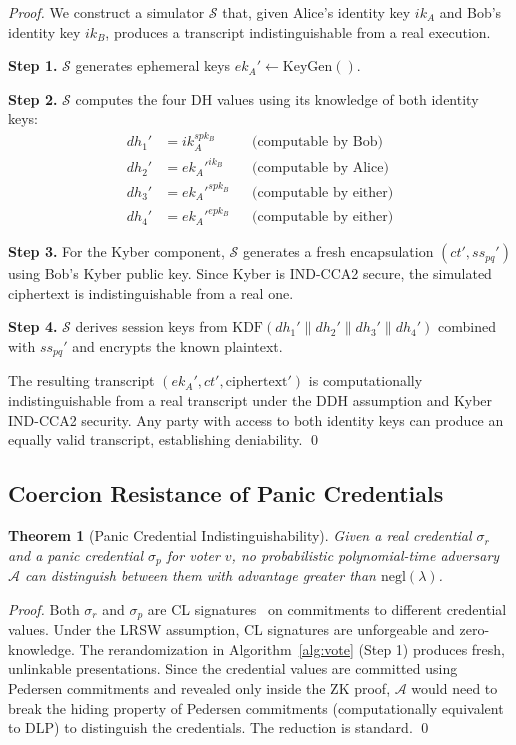 \documentclass[11pt,a4paper]{article}
\newtheorem{theorem}{Theorem}
\begin{document}
\begin{proof}
We construct a simulator $\mathcal{S}$ that, given Alice's identity key $ik_A$ and Bob's identity key $ik_B$, produces a transcript indistinguishable from a real execution.

\textbf{Step 1.} $\mathcal{S}$ generates ephemeral keys $ek_A' \leftarrow \text{KeyGen}()$.

\textbf{Step 2.} $\mathcal{S}$ computes the four DH values using its knowledge of both identity keys:
\begin{align}
dh_1' &= ik_A^{spk_B} && \text{(computable by Bob)} \\
dh_2' &= ek_A'^{ik_B} && \text{(computable by Alice)} \\
dh_3' &= ek_A'^{spk_B} && \text{(computable by either)} \\
dh_4' &= ek_A'^{epk_B} && \text{(computable by either)}
\end{align}

\textbf{Step 3.} For the Kyber component, $\mathcal{S}$ generates a fresh encapsulation $(ct', ss_{pq}')$ using Bob's Kyber public key. Since Kyber is IND-CCA2 secure, the simulated ciphertext is indistinguishable from a real one.

\textbf{Step 4.} $\mathcal{S}$ derives session keys from $\text{KDF}(dh_1' \| dh_2' \| dh_3' \| dh_4')$ combined with $ss_{pq}'$ and encrypts the known plaintext.

The resulting transcript $(ek_A', ct', \text{ciphertext}')$ is computationally indistinguishable from a real transcript under the DDH assumption and Kyber IND-CCA2 security. Any party with access to both identity keys can produce an equally valid transcript, establishing deniability. \qed
\end{proof}

\subsection{Coercion Resistance of Panic Credentials}

\begin{theorem}[Panic Credential Indistinguishability]
Given a real credential $\sigma_r$ and a panic credential $\sigma_p$ for voter $v$, no probabilistic polynomial-time adversary $\mathcal{A}$ can distinguish between them with advantage greater than $\text{negl}(\lambda)$.
\end{theorem}

\begin{proof}
Both $\sigma_r$ and $\sigma_p$ are CL signatures~\cite{camenisch2001efficient} on commitments to different credential values. Under the LRSW assumption, CL signatures are unforgeable and zero-knowledge. The rerandomization in Algorithm~\ref{alg:vote} (Step 1) produces fresh, unlinkable presentations. Since the credential values are committed using Pedersen commitments and revealed only inside the ZK proof, $\mathcal{A}$ would need to break the hiding property of Pedersen commitments (computationally equivalent to DLP) to distinguish the credentials. The reduction is standard. \qed
\end{proof}
\end{document}
